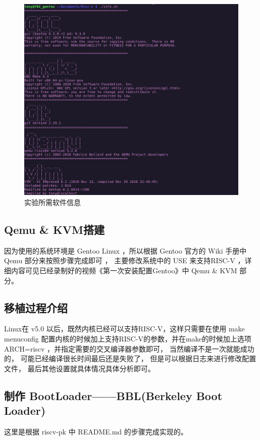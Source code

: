\begin{figure}[htbp]
  \centering %
  \includegraphics[width=1.0 \textwidth]{figs/Process/info.png}
  \caption{实验所需软件信息}
  \label{fig:info} %
\end{figure}

\subsection{Qemu \& KVM搭建}
因为使用的系统环境是 Gentoo Linux ，所以根据 Gentoo 官方的 Wiki 手册中 Qemu 部分来按照步骤完成即可 \cite{GentooQemu} ， 主要修改系统中的 USE 来支持RISC-V \cite{KVM安装与配置} ，详细内容可见已经录制好的视频《第一次安装配置Gentoo》\cite{第一次安装配置Gentoo}中 Qemu \& KVM 部分。
% 
\subsection{移植过程介绍}
Linux在 v5.0 以后，既然内核已经可以支持RISC-V，这样只需要在使用 make menuconfig 配置内核的时候加上支持RISC-V的参数，并在make的时候加上选项 ARCH=riscv ，并指定需要的交叉编译器参数即可， 当然编译不是一次就能成功的， 可能已经编译很长时间最后还是失败了， 但是可以根据日志来进行修改配置文件， 最后其他设置就具体情况具体分析即可。

\subsection{制作 BootLoader——BBL(Berkeley Boot Loader)}
这里是根据 riscv-pk \cite{riscv-pk} 中 README.md 的步骤完成实现的。

